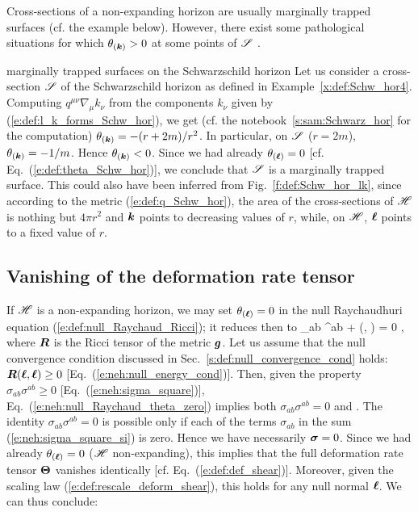 Cross-sections of a non-expanding horizon are usually marginally trapped surfaces
(cf. the example below).
However, there exist some pathological situations for
which $\theta_{(\bm{k})} > 0$ at some points of $\mathscr{S}$ \cite{GerocH82}.

\begin{texample}{marginally trapped surfaces on the Schwarzschild horizon}{}
Let us consider a cross-section $\mathscr{S}$ of the Schwarzschild horizon as
defined in Example~\ref{x:def:Schw_hor4}.
Computing $q^{\mu\nu} \nabla_\mu k_\nu$ from the components $k_\nu$
given by (\ref{e:def:l_k_forms_Schw_hor}), we get (cf. the notebook~\ref{s:sam:Schwarz_hor} for
the computation) $\theta_{(\bm{k})} = - (r+2m)/r^2$.
In particular, on $\mathscr{S}$ ($r=2m$), $\theta_{(\bm{k})}  = - 1/m$.
Hence $\theta_{(\bm{k})} < 0$. Since we had already $\theta_{(\bm{\ell})}=0$
[cf. Eq.~(\ref{e:def:theta_Schw_hor})], we conclude that $\mathscr{S}$ is a
marginally trapped surface. This could also have been inferred from
Fig.~\ref{f:def:Schw_hor_lk}, since according to the metric
(\ref{e:def:q_Schw_hor}), the area of the cross-sections of $\mathscr{H}$
is nothing but $4\pi r^2$ and $\bm{k}$ points to decreasing values of $r$, while, on $\mathscr{H}$,
$\bm{\ell}$ points to a fixed value of $r$.
\end{texample}

\subsection{Vanishing of the deformation rate tensor}

If $\mathscr{H}$ is a non-expanding horizon, we may set $\theta_{(\bm{\ell})}=0$
in the null Raychaudhuri equation (\ref{e:def:null_Raychaud_Ricci}); it reduces then
to
\be \label{e:neh:null_Raychaud_theta_zero}
    \sigma_{ab} \sigma^{ab} + (\wl, \wl) = 0 ,
\ee
where $\bm{R}$ is the Ricci tensor of the metric $\bm{g}$.
Let us assume that the null convergence condition
discussed in Sec.~\ref{s:def:null_convergence_cond}
holds: $\bm{R}(\bm{\ell}, \bm{\ell}) \geq 0$ [Eq.~(\ref{e:neh:null_energy_cond})].
Then, given the property $\sigma_{ab} \sigma^{ab} \geq 0$
[Eq.~(\ref{e:neh:sigma_square})],
Eq.~(\ref{e:neh:null_Raychaud_theta_zero}) implies both
$\sigma_{ab} \sigma^{ab}  = 0$
and
\be \label{e:neh:R_l_l_zero}
    .
\ee
The identity $\sigma_{ab} \sigma^{ab} = 0$ is possible only if each of
the terms $\sigma_{ab}$ in the sum (\ref{e:neh:sigma_square_si}) is zero. Hence we have necessarily
$\bm{\sigma} = 0$.
Since we had already $\theta_{(\bm{\ell})}=0$ ($\mathscr{H}$ non-expanding), this implies that the full deformation rate tensor
$\bm{\Theta}$
vanishes identically [cf. Eq.~(\ref{e:def:def_shear})]. Moreover,
given the scaling law (\ref{e:def:rescale_deform_shear}), this holds for
any null normal $\bm{\ell}$. We can thus conclude:

